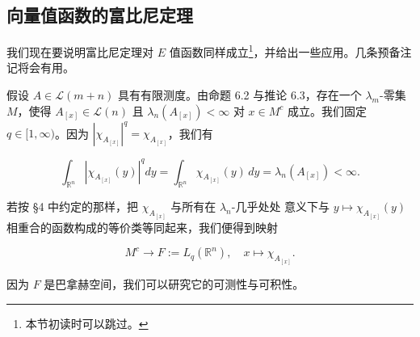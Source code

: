 \subsection*{向量值函数的富比尼定理}

我们现在要说明富比尼定理对 $ E $ 值函数同样成立\footnote{本节初读时可以跳过。}，并给出一些应用。几条预备注记将会有用。

假设 $ A \in \mathcal{L}(m+n) $ 具有有限测度。由命题 6.2 与推论 6.3，存在一个 $ \lambda_m $-零集 $ M $，使得 $ A_{[x]} \in \mathcal{L}(n) $ 且 $ \lambda_n(A_{[x]}) < \infty $ 对 $ x \in M^c $ 成立。我们固定 $ q \in [1,\infty) $。因为 $ |\chi_{A_{[x]}}|^q = \chi_{A_{[x]}} $，我们有

\[
\int_{\mathbb{R}^n}|\chi_{A_{[x]}}(y)|^q dy = \int_{\mathbb{R}^n}\chi_{A_{[x]}}(y)\,dy = \lambda_n(A_{[x]}) < \infty .
\]

若按 §4 中约定的那样，把 $ \chi_{A_{[x]}} $ 与所有在 $ \lambda_n $-几乎处处 意义下与 $ y \mapsto \chi_{A_{[x]}}(y) $ 相重合的函数构成的等价类等同起来，我们便得到映射

\[
M^c \to F := L_q(\mathbb{R}^n) , \quad x \mapsto \chi_{A_{[x]}} .
\]

因为 $ F $ 是巴拿赫空间，我们可以研究它的可测性与可积性。

